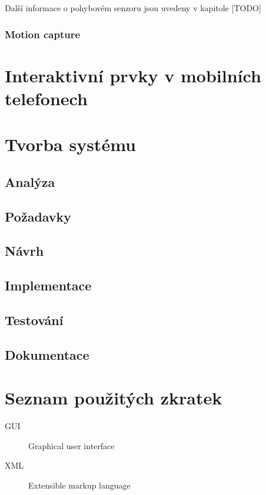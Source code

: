 \documentclass[thesis=B,czech,hidelinks]{FITthesis}[2012/06/26] %
\begin{document}
Další informace o pohybovém senzoru jsou uvedeny v kapitole [TODO]

\subsection{Motion capture}





\chapter{Interaktivní prvky v mobilních telefonech}

\chapter{Tvorba systému}

\section{Analýza}
\section{Požadavky}
\section{Návrh}
\section{Implementace}
\section{Testování}
\section{Dokumentace}

\begin{conclusion}
	
\end{conclusion}




\appendix

\chapter{Seznam použitých zkratek}
\begin{description}
	\item[GUI] Graphical user interface
	\item[XML] Extensible markup language
\end{description}
\end{document}
